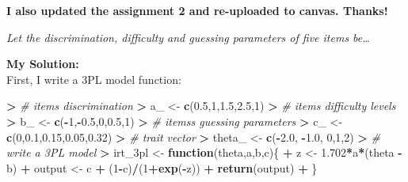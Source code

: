 \documentclass[
]{article}
\newenvironment{Shaded}{\begin{snugshade}}{\end{snugshade}}
\newcommand{\CommentTok}[1]{\textcolor[rgb]{0.56,0.35,0.01}{\textit{#1}}}
\newcommand{\ControlFlowTok}[1]{\textcolor[rgb]{0.13,0.29,0.53}{\textbf{#1}}}
\newcommand{\DecValTok}[1]{\textcolor[rgb]{0.00,0.00,0.81}{#1}}
\newcommand{\ErrorTok}[1]{\textcolor[rgb]{0.64,0.00,0.00}{\textbf{#1}}}
\newcommand{\FloatTok}[1]{\textcolor[rgb]{0.00,0.00,0.81}{#1}}
\newcommand{\FunctionTok}[1]{\textcolor[rgb]{0.13,0.29,0.53}{\textbf{#1}}}
\newcommand{\NormalTok}[1]{#1}
\newcommand{\OtherTok}[1]{\textcolor[rgb]{0.56,0.35,0.01}{#1}}
\newcommand{\SpecialCharTok}[1]{\textcolor[rgb]{0.81,0.36,0.00}{\textbf{#1}}}
\begin{document}
\textbf{I also updated the assignment 2 and re-uploaded to canvas.
Thanks!}

\emph{Let the discrimination, difficulty and guessing parameters of five
items be\ldots{}}

\textbf{My Solution:}\\
First, I write a 3PL model function:

\begin{Shaded}
\begin{Highlighting}[]
\SpecialCharTok{\textgreater{}} \CommentTok{\# items\textquotesingle{} discrimination}
\ErrorTok{\textgreater{}}\NormalTok{ a\_ }\OtherTok{\textless{}{-}} \FunctionTok{c}\NormalTok{(}\FloatTok{0.5}\NormalTok{,}\DecValTok{1}\NormalTok{,}\FloatTok{1.5}\NormalTok{,}\FloatTok{2.5}\NormalTok{,}\DecValTok{1}\NormalTok{)}
\SpecialCharTok{\textgreater{}} \CommentTok{\# items\textquotesingle{} difficulty levels}
\ErrorTok{\textgreater{}}\NormalTok{ b\_ }\OtherTok{\textless{}{-}} \FunctionTok{c}\NormalTok{(}\SpecialCharTok{{-}}\DecValTok{1}\NormalTok{,}\SpecialCharTok{{-}}\FloatTok{0.5}\NormalTok{,}\DecValTok{0}\NormalTok{,}\FloatTok{0.5}\NormalTok{,}\DecValTok{1}\NormalTok{)}
\SpecialCharTok{\textgreater{}} \CommentTok{\# items\textquotesingle{}s guessing parameters}
\ErrorTok{\textgreater{}}\NormalTok{ c\_ }\OtherTok{\textless{}{-}} \FunctionTok{c}\NormalTok{(}\DecValTok{0}\NormalTok{,}\FloatTok{0.1}\NormalTok{,}\FloatTok{0.15}\NormalTok{,}\FloatTok{0.05}\NormalTok{,}\FloatTok{0.32}\NormalTok{)}
\SpecialCharTok{\textgreater{}} \CommentTok{\# trait vector}
\ErrorTok{\textgreater{}}\NormalTok{ theta\_ }\OtherTok{\textless{}{-}} \FunctionTok{c}\NormalTok{(}\SpecialCharTok{{-}}\FloatTok{2.0}\NormalTok{, }\SpecialCharTok{{-}}\FloatTok{1.0}\NormalTok{, }\DecValTok{0}\NormalTok{,}\DecValTok{1}\NormalTok{,}\DecValTok{2}\NormalTok{)}
\SpecialCharTok{\textgreater{}} \CommentTok{\# write a 3PL model}
\ErrorTok{\textgreater{}}\NormalTok{ irt\_3pl }\OtherTok{\textless{}{-}} \ControlFlowTok{function}\NormalTok{(theta,a,b,c)\{}
\SpecialCharTok{+}\NormalTok{   z }\OtherTok{\textless{}{-}} \FloatTok{1.702}\SpecialCharTok{*}\NormalTok{a}\SpecialCharTok{*}\NormalTok{(theta }\SpecialCharTok{{-}}\NormalTok{ b)}
\SpecialCharTok{+}\NormalTok{   output }\OtherTok{\textless{}{-}}\NormalTok{ c }\SpecialCharTok{+}\NormalTok{ (}\DecValTok{1}\SpecialCharTok{{-}}\NormalTok{c)}\SpecialCharTok{/}\NormalTok{(}\DecValTok{1}\SpecialCharTok{+}\FunctionTok{exp}\NormalTok{(}\SpecialCharTok{{-}}\NormalTok{z))}
\SpecialCharTok{+}   \FunctionTok{return}\NormalTok{(output)}
\SpecialCharTok{+}\NormalTok{ \}}
\end{Highlighting}
\end{Shaded}
\end{document}
